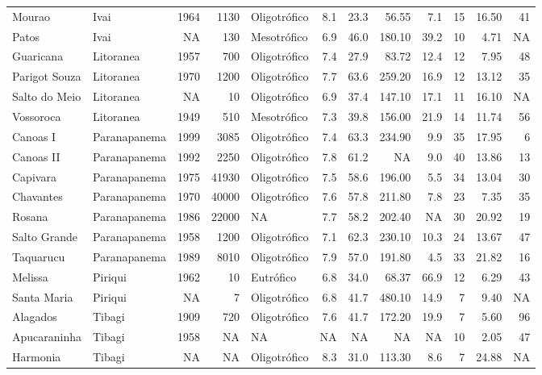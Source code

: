 \documentclass[
]{book}
\begin{document}
\begin{table}
\begin{tabular}{llrrlrrrrrrr}
Mourao & Ivai & 1964 & 1130 & Oligotrófico & 8.1 & 23.3 & 56.55 & 7.1 & 15 & 16.50 & 41\\
Patos & Ivai & NA & 130 & Mesotrófico & 6.9 & 46.0 & 180.10 & 39.2 & 10 & 4.71 & NA\\
\addlinespace
Guaricana & Litoranea & 1957 & 700 & Oligotrófico & 7.4 & 27.9 & 83.72 & 12.4 & 12 & 7.95 & 48\\
Parigot Souza & Litoranea & 1970 & 1200 & Oligotrófico & 7.7 & 63.6 & 259.20 & 16.9 & 12 & 13.12 & 35\\
Salto do Meio & Litoranea & NA & 10 & Oligotrófico & 6.9 & 37.4 & 147.10 & 17.1 & 11 & 16.10 & NA\\
Vossoroca & Litoranea & 1949 & 510 & Mesotrófico & 7.3 & 39.8 & 156.00 & 21.9 & 14 & 11.74 & 56\\
Canoas I & Paranapanema & 1999 & 3085 & Oligotrófico & 7.4 & 63.3 & 234.90 & 9.9 & 35 & 17.95 & 6\\
\addlinespace
Canoas II & Paranapanema & 1992 & 2250 & Oligotrófico & 7.8 & 61.2 & NA & 9.0 & 40 & 13.86 & 13\\
Capivara & Paranapanema & 1975 & 41930 & Oligotrófico & 7.5 & 58.6 & 196.00 & 5.5 & 34 & 13.04 & 30\\
Chavantes & Paranapanema & 1970 & 40000 & Oligotrófico & 7.6 & 57.8 & 211.80 & 7.8 & 23 & 7.35 & 35\\
Rosana & Paranapanema & 1986 & 22000 & NA & 7.7 & 58.2 & 202.40 & NA & 30 & 20.92 & 19\\
Salto Grande & Paranapanema & 1958 & 1200 & Oligotrófico & 7.1 & 62.3 & 230.10 & 10.3 & 24 & 13.67 & 47\\
\addlinespace
Taquarucu & Paranapanema & 1989 & 8010 & Oligotrófico & 7.9 & 57.0 & 191.80 & 4.5 & 33 & 21.82 & 16\\
Melissa & Piriqui & 1962 & 10 & Eutrófico & 6.8 & 34.0 & 68.37 & 66.9 & 12 & 6.29 & 43\\
Santa Maria & Piriqui & NA & 7 & Oligotrófico & 6.8 & 41.7 & 480.10 & 14.9 & 7 & 9.40 & NA\\
Alagados & Tibagi & 1909 & 720 & Oligotrófico & 7.6 & 41.7 & 172.20 & 19.9 & 7 & 5.60 & 96\\
Apucaraninha & Tibagi & 1958 & NA & NA & NA & NA & NA & NA & 10 & 2.05 & 47\\
\addlinespace
Harmonia & Tibagi & NA & NA & Oligotrófico & 8.3 & 31.0 & 113.30 & 8.6 & 7 & 24.88 & NA\\
\bottomrule
\end{tabular}
\endgroup{}
\end{table}
\end{document}
